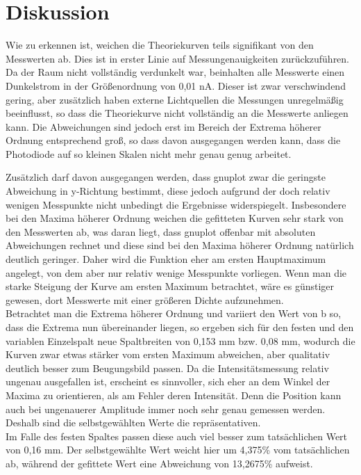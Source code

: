 \section{Diskussion}
Wie zu erkennen ist, weichen die Theoriekurven teils signifikant von den Messwerten ab. Dies ist in erster Linie auf Messungenauigkeiten zurückzuführen. Da der Raum nicht vollständig verdunkelt war, beinhalten alle Messwerte einen Dunkelstrom in der Größenordnung von 0,01 nA. Dieser ist zwar verschwindend gering, aber zusätzlich haben externe Lichtquellen die Messungen unregelmäßig beeinflusst, so dass die Theoriekurve nicht vollständig an die Messwerte anliegen kann.
Die Abweichungen sind jedoch erst im Bereich der Extrema höherer Ordnung entsprechend groß, so dass davon ausgegangen werden kann, dass die Photodiode auf so kleinen Skalen nicht mehr genau genug arbeitet.

Zusätzlich darf davon ausgegangen werden, dass gnuplot zwar die geringste Abweichung in y-Richtung bestimmt, diese jedoch aufgrund der doch relativ wenigen Messpunkte nicht unbedingt die Ergebnisse widerspiegelt. Insbesondere bei den Maxima höherer Ordnung weichen die gefitteten Kurven sehr stark von den Messwerten ab, was daran liegt, dass gnuplot offenbar mit absoluten Abweichungen rechnet und diese sind bei den Maxima höherer Ordnung natürlich deutlich geringer. Daher wird die Funktion eher am ersten Hauptmaximum angelegt, von dem aber nur relativ wenige Messpunkte vorliegen. Wenn man die starke Steigung der Kurve am ersten Maximum betrachtet, wäre es günstiger gewesen, dort Messwerte mit einer größeren Dichte aufzunehmen.\\

Betrachtet man die Extrema höherer Ordnung und variiert den Wert von b so, dass die Extrema nun übereinander liegen, so ergeben sich für den festen und den variablen Einzelspalt neue Spaltbreiten von 0,153 mm bzw. 0,08 mm, wodurch die Kurven zwar etwas stärker vom ersten Maximum abweichen, aber qualitativ deutlich besser zum Beugungsbild passen.
Da die Intensitätsmessung relativ ungenau ausgefallen ist, erscheint es sinnvoller, sich eher an dem Winkel der Maxima zu orientieren, als am Fehler deren Intensität. Denn die Position kann auch bei ungenauerer Amplitude immer noch sehr genau gemessen werden. Deshalb sind die selbstgewählten Werte die repräsentativen.\\

Im Falle des festen Spaltes passen diese auch viel besser zum tatsächlichen Wert von 0,16 mm.
Der selbstgewählte Wert weicht hier um 4,375\% vom tatsächlichen ab, während der gefittete Wert eine Abweichung von 13,2675\% aufweist.\\

